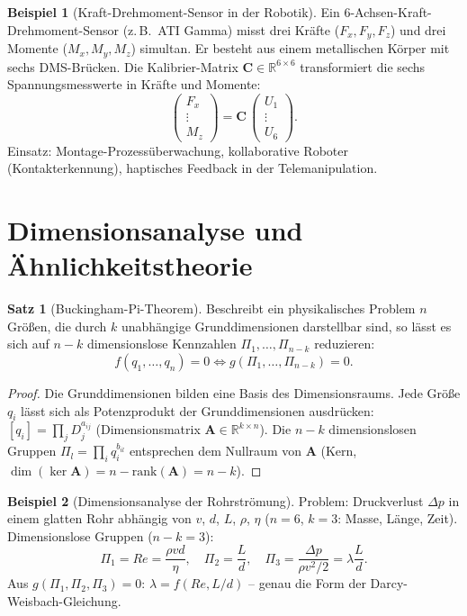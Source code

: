 ﻿\documentclass[a4paper,12pt]{report}
\theoremstyle{definition}
\newtheorem{beispiel}{Beispiel}
\newtheorem{satz}{Satz}
\begin{document}
\begin{beispiel}[Kraft-Drehmoment-Sensor in der Robotik]
Ein 6-Achsen-Kraft-Drehmoment-Sensor (z.\,B.\ ATI Gamma) misst
drei Kräfte ($F_x, F_y, F_z$) und drei Momente ($M_x, M_y, M_z$) simultan.
Er besteht aus einem metallischen Körper mit sechs DMS-Brücken.
Die Kalibrier-Matrix $\mathbf{C} \in \mathbb{R}^{6\times6}$
transformiert die sechs Spannungsmesswerte in Kräfte und Momente:
\[
  \begin{pmatrix}F_x\\ \vdots \\ M_z\end{pmatrix} = \mathbf{C}\,\begin{pmatrix}U_1\\ \vdots \\ U_6\end{pmatrix}.
\]
Einsatz: Montage-Prozessüberwachung, kollaborative Roboter
(Kontakterkennung), haptisches Feedback in der Telemanipulation.
\end{beispiel}


\section{Dimensionsanalyse und Ähnlichkeitstheorie}

\begin{satz}[Buckingham-Pi-Theorem]
Beschreibt ein physikalisches Problem $n$ Größen, die durch $k$
unabhängige Grunddimensionen darstellbar sind, so lässt es sich auf
$n - k$ dimensionslose Kennzahlen $\Pi_1, \ldots, \Pi_{n-k}$ reduzieren:
\[
  f(q_1, \ldots, q_n) = 0 \iff g(\Pi_1, \ldots, \Pi_{n-k}) = 0.
\]
\end{satz}
\begin{proof}
Die Grunddimensionen bilden eine Basis des Dimensionsraums.
Jede Größe $q_i$ lässt sich als Potenzprodukt der Grunddimensionen
ausdrücken: $[q_i] = \prod_j D_j^{a_{ij}}$ (Dimensionsmatrix $\mathbf{A} \in \mathbb{R}^{k\times n}$).
Die $n-k$ dimensionslosen Gruppen $\Pi_l = \prod_i q_i^{b_{il}}$ entsprechen
dem Nullraum von $\mathbf{A}$ (Kern, $\dim(\ker\mathbf{A}) = n - \mathrm{rank}(\mathbf{A}) = n-k$).
\end{proof}

\begin{beispiel}[Dimensionsanalyse der Rohrströmung]
Problem: Druckverlust $\Delta p$ in einem glatten Rohr abhängig von
$v$, $d$, $L$, $\rho$, $\eta$ ($n=6$, $k=3$: Masse, Länge, Zeit).
Dimensionslose Gruppen ($n-k=3$):
\[
  \Pi_1 = Re = \frac{\rho v d}{\eta}, \quad
  \Pi_2 = \frac{L}{d}, \quad
  \Pi_3 = \frac{\Delta p}{\rho v^2/2} = \lambda\frac{L}{d}.
\]
Aus $g(\Pi_1,\Pi_2,\Pi_3) = 0$: $\lambda = f(Re, L/d)$
-- genau die Form der Darcy-Weisbach-Gleichung.
\end{beispiel}
\end{document}
